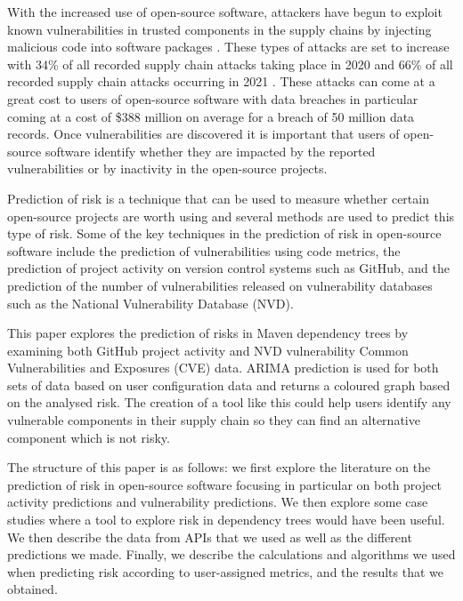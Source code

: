 \documentclass[10pt, compsoc, conference]{IEEEtran}
\begin{document}
With the increased use of open-source software, attackers have begun to exploit known vulnerabilities in trusted components in the supply chains by injecting malicious code into software packages \cite{ohm_backstabbers_2020}. These types of attacks are set to increase with 34\% of all recorded supply chain attacks taking place in 2020 and 66\% of all recorded supply chain attacks occurring in 2021 \cite{m_z_malik_protection_2023}. These attacks can come at a great cost to users of open-source software with data breaches in particular coming at a cost of \$388 million on average for a breach of 50 million data records\cite{x_wang_feasibility_2021}. Once vulnerabilities are discovered it is important that users of open-source software identify whether they are impacted by the reported vulnerabilities or by inactivity in the open-source projects. 

Prediction of risk is a technique that can be used to measure whether certain open-source projects are worth using and several methods are used to predict this type of risk. Some of the key techniques in the prediction of risk in open-source software include the prediction of vulnerabilities using code metrics, the prediction of project activity on version control systems such as GitHub, and the prediction of the number of vulnerabilities released on vulnerability databases such as the National Vulnerability Database (NVD). 

This paper explores the prediction of risks in Maven dependency trees by examining both GitHub project activity and NVD vulnerability Common Vulnerabilities and Exposures (CVE) data. ARIMA prediction is used for both sets of data based on user configuration data and returns a coloured graph based on the analysed risk. The creation of a tool like this could help users identify any vulnerable components in their supply chain so they can find an alternative component which is not risky. 

The structure of this paper is as follows: we first explore the literature on the prediction of risk in open-source software focusing in particular on both project activity predictions and vulnerability predictions. We then explore some case studies where a tool to explore risk in dependency trees would have been useful. We then describe the data from APIs that we used as well as the different predictions we made. Finally, we describe the calculations and algorithms we used when predicting risk according to user-assigned metrics, and the results that we obtained. 
\end{document}
